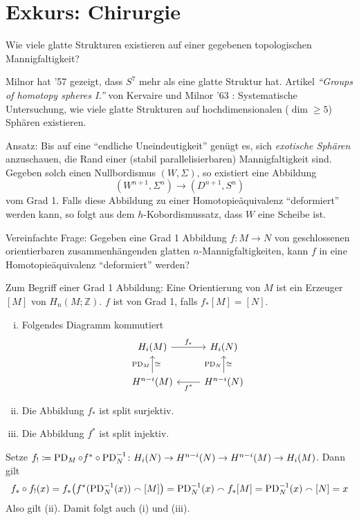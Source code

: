 



\newpage




\section{Exkurs: Chirurgie} %
\label{sec:7}

\begin{frage}
	Wie viele glatte Strukturen existieren auf einer gegebenen topologischen Mannigfaltigkeit?
\end{frage}

Milnor hat '57 gezeigt, dass $S^7$ mehr als eine glatte Struktur hat. 
Artikel \emph{\enquote{Groups of homotopy spheres I.}} von Kervaire und Milnor '63 : Systematische Untersuchung, wie viele glatte Strukturen auf hochdimensionalen ($\dim \ge 5$) Sphären existieren. 

Ansatz: Bis auf eine \enquote{endliche Uneindeutigkeit} genügt es, sich \emph{exotische Sphären} anzuschauen, die Rand einer (stabil parallelisierbaren) Mannigfaltigkeit sind.
Gegeben solch einen Nullbordismus $(W,\Sigma)$, so existiert eine Abbildung 
\[
	(W^{n+1},\Sigma^n) \longrightarrow (D^{n+1},S^n) 
\]
vom Grad 1. 
Falls diese Abbildung zu einer Homotopieäquivalenz \enquote{deformiert} werden kann, so folgt aus dem $h$-Kobordismussatz, dass $W$ eine Scheibe ist.

Vereinfachte Frage: Gegeben eine Grad 1 Abbildung $f \colon M \to N$ von geschlossenen orientierbaren zusammenhängenden glatten $n$-Mannigfaltigkeiten, kann $f$ in eine Homotopieäquivalenz \enquote{deformiert} werden?

\begin{erinnerung}
	Zum Begriff einer Grad 1 Abbildung: Eine Orientierung von $M$ ist ein Erzeuger $[M]$ von $H_n(M;\mathbb{Z})$. 
	$f$ ist von Grad 1, falls $f_*[M]=[N]$.
\end{erinnerung}

\begin{lemma}[label=lem:ex:lem1]
	\begin{enumerate}[(i)]
		\item Folgendes Diagramm kommutiert
		\[
			\begin{tikzcd}
				H_i(M) \rar["f_*"] & H_i(N) \\
				H^{n-i}(M) \uar["\PD_M","\cong"'] & H^{n-i}(N) \lar["f^*"] \uar["\PD_N","\cong"']
			\end{tikzcd}
		\]
		\item Die Abbildung $f_*$ ist split surjektiv.
		\item Die Abbildung $f^*$ ist split injektiv.
	\end{enumerate}
\end{lemma}
\begin{beweis}
	Setze $f_! \coloneqq \PD_M \circ f^* \circ  \PD^{-1}_N \colon H_i(N) \to H^{n-i}(N) \to H^{n-i}(M) \to H_i(M)$.
	Dann gilt 
	\[
		f_* \circ f_!(x) = f_* \enbrace[\big]{f^* (\PD^{-1}_N(x)) \capp [M]} = \PD_N^{-1}(x) \capp f_*[M] = \PD_N^{-1}(x) \capp [N] = x
	\]
	Also gilt (ii).
	Damit folgt auch (i) und (iii).
\end{beweis}

